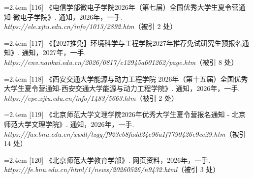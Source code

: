 {\nopagebreak\vspace{1pt}
\noindent\hangindent=2.4em \label{src:S0144}{\color{cAccent}[116]} 《电信学部微电子学院2026年（第七届）全国优秀大学生夏令营通知-微电子学院》. 通知，2026年，一手. \textit{https://ele.xjtu.edu.cn/info/1013/2892.htm}（被引 2 处）\par
\vspace{0.6pt}
\vspace{3.5pt}\par
\nopagebreak\vspace{1pt}
\noindent\hangindent=2.4em \label{src:S0145}{\color{cAccent}[117]} 《【2027推免】环境科学与工程学院2027年推荐免试研究生预报名通知》. 通知，2027年，一手. \textit{https://env.nankai.edu.cn/2026/0817/c12945a601262/page.htm}（被引 8 处）\par
\vspace{0.6pt}
\vspace{3.5pt}\par
\nopagebreak\vspace{1pt}
\noindent\hangindent=2.4em \label{src:S0147}{\color{cAccent}[118]} 《西安交通大学能源与动力工程学院 2026年（第十五届）全国优秀大学生夏令营通知-西安交通大学能源与动力工程学院》. 通知，2026年，一手. \textit{https://epe.xjtu.edu.cn/info/1483/5663.htm}（被引 2 处）\par
\vspace{0.6pt}
\vspace{3.5pt}\par
\nopagebreak\vspace{1pt}
\noindent\hangindent=2.4em \label{src:S0149}{\color{cAccent}[119]} 《北京师范大学文理学院2026年优秀大学生夏令营报名通知 - 北京师范大学文理学院》. 通知，2026年，一手. \textit{https://fas.bnu.edu.cn/xwdt/tzgg/f923eb8fadd24e96a1f7790426e9ce29.htm}（被引 14 处）\par
\vspace{0.6pt}
\noindent\hangindent=2.4em \label{src:S0151}{\color{cAccent}[120]} 《北京师范大学教育学部》. 网页资料，2026年，一手. \textit{https://fe.bnu.edu.cn/html/1/news/20260526/n9432.html}（被引 3 处）\par
\vspace{0.6pt}
\vspace{3.5pt}\par
\nopagebreak\vspace{1pt}
}
